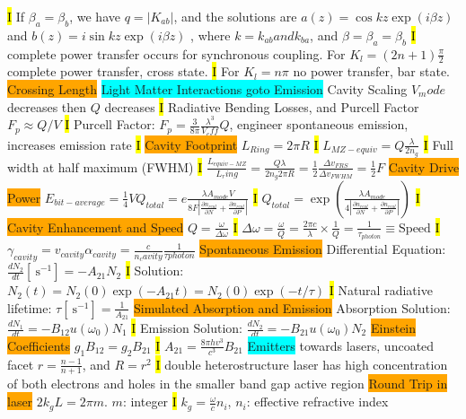 \documentclass[fontsize=3]{scrartcl}
\begin{document}
\hl{I}
If $\beta_a = \beta_b$, we have $q=|K_{ab}|$, and the solutions are $a(z) = \cos kz\exp(i\beta z)$ and $b(z) = i\sin kz\exp(i\beta z)$
, where $k = k_{ab} and k_{ba}$, and $\beta = \beta_a = \beta_b$
\hl{I}
complete power transfer occurs for synchronous coupling. For $K_{l} = (2n + 1)\frac{\pi}{2}$ complete power transfer, cross state. 
\hl{I}
For $K_{l}= n \pi$ no power transfer, bar state. 
\colorbox{Orange}{Crossing Length}
\colorbox{Cyan}{Light Matter Interactions goto Emission}
Cavity Scaling $V_mode$ decreases then $Q$ decreases
\hl{I}
Radiative Bending Losses, and Purcell Factor $F_p \approx Q/V$
\hl{I}
Purcell Factor: $F_p = \frac{3}{8\pi}\frac{\lambda^3}{V_eff}Q$, engineer spontaneous emission, increases emission rate
\hl{I}
\colorbox{Orange}{Cavity Footprint}
$L_{Ring} = 2\pi R$
\hl{I}
$L_{MZ-equiv} = Q\frac{\lambda}{2n_g}$
\hl{I}
Full width at half maximum (FWHM)
\hl{I}
$\frac{L_{equiv-MZ}}{L_ring} = \frac{Q \lambda}{2n_g 2 \pi R} = \frac{1}{2} \frac{\Delta v_{FRS}}{\Delta v_{FWHM}} = \frac{1}{2}F$
\colorbox{Orange}{Cavity Drive Power}
$E_{bit-average} = \frac{1}{4}VQ_{total} = e\frac{\lambda A_{mode}V}{8F|\frac{\partial n_{real}}{\partial N} + \frac{\partial n_{real}}{\partial P} |}$
\hl{I}
$Q_{total} = \exp(\frac{\lambda A_{mode}}{4|\frac{\partial n_{real}}{\partial N} + \frac{\partial n_{real}}{\partial P} |})$
\hl{I}
\colorbox{Orange}{Cavity Enhancement and Speed}
$Q = \frac{\omega}{\Delta \omega}$
\hl{I}
$\Delta \omega = \frac{\omega}{Q} = \frac{2 \pi c}{\lambda} \times \frac{1}{Q} = \frac{1}{\tau_{photon}} \equiv \text{Speed}$
\hl{I}
$\gamma_{cavity} = v_{cavity} \alpha_{cavity} = \frac{c}{n_cavity} \frac{1}{\tau{photon}}$
\colorbox{Orange}{Spontaneous Emission}
Differential Equation: $\frac{dN_2}{dt} [\SI{}{\second^{-1}}]= -A_{21}N_2 $
\hl{I}
Solution: $N_2(t) = N_2 (0) \exp(-A_{21}t) = N_2 (0) \exp(-t/\tau) $
\hl{I}
Natural radiative lifetime: $\tau [\SI{}{\second^{-1}}] = \frac{1}{A_{21}}$
\colorbox{Orange}{Simulated Absorption and Emission}
Absorption Solution: $\frac{dN_1}{dt} = -B_{12} u(\omega_0)N_1$ 
\hl{I}
Emission Solution: $\frac{dN_2}{dt} = -B_{21} u(\omega_0)N_2$ 
\colorbox{Orange}{Einstein Coefficients}
$g_1 B_{12} = g_2 B_{21}$
\hl{I}
$A_{21} = \frac{8 \pi h v^3}{c^3}B_{21}$
\colorbox{Cyan}{Emitters}
towards lasers, uncoated facet
$r = \frac{n-1}{n+1}$, and $R = r^2$
\hl{I}
double heterostructure laser has high concentration of both electrons and holes in the smaller band gap active region
\colorbox{Orange}{Round Trip in laser}
$2k_g L = 2\pi m$. $m$: integer
\hl{I}
$k_g = \frac{\omega}{c}n_i$, $n_i$: effective refractive index
\end{document}
